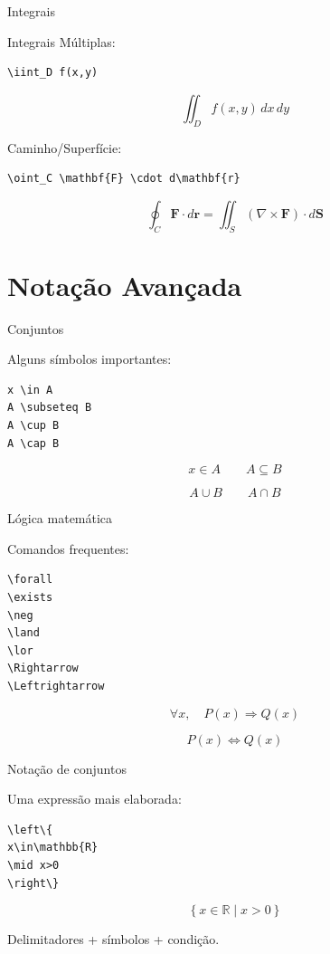 \documentclass[aspectratio=169,xcolor=dvipsnames]{beamer}
\begin{document}
\begin{frame}[fragile]{Integrais}

    
    Integrais Múltiplas:

\begin{lstlisting}
\iint_D f(x,y)
\end{lstlisting}

    \[
    \iint_D f(x,y) \,dx\,dy
    \]

    Caminho/Superfície:

\begin{lstlisting}
\oint_C \mathbf{F} \cdot d\mathbf{r}
\end{lstlisting}

    \[
    \oint_C \mathbf{F} \cdot d\mathbf{r} = \iint_S (\nabla \times \mathbf{F}) \cdot d\mathbf{S}
    \]

\end{frame}

\section{Notação Avançada}

\begin{frame}[fragile]{Conjuntos}

    Alguns símbolos importantes:

\begin{lstlisting}
x \in A
A \subseteq B
A \cup B
A \cap B
\end{lstlisting}

    \[
        x\in A
        \qquad
        A\subseteq B
    \]

    \[
        A\cup B
        \qquad
        A\cap B
    \]

\end{frame}

\begin{frame}[fragile]{Lógica matemática}

    Comandos frequentes:

\begin{lstlisting}
\forall
\exists
\neg
\land
\lor
\Rightarrow
\Leftrightarrow
\end{lstlisting}

    \[
        \forall x,\quad
        P(x)\Rightarrow Q(x)
    \]

    \[
        P(x)\Leftrightarrow Q(x)
    \]

\end{frame}

\begin{frame}[fragile]{Notação de conjuntos}

    Uma expressão mais elaborada:

\begin{lstlisting}
\left\{
x\in\mathbb{R}
\mid x>0
\right\}
\end{lstlisting}

    \[
        \left\{
            x\in\mathbb{R}
            \mid x>0
        \right\}
    \]

    \begin{center}
        Delimitadores + símbolos + condição.
    \end{center}

\end{frame}
\end{document}
